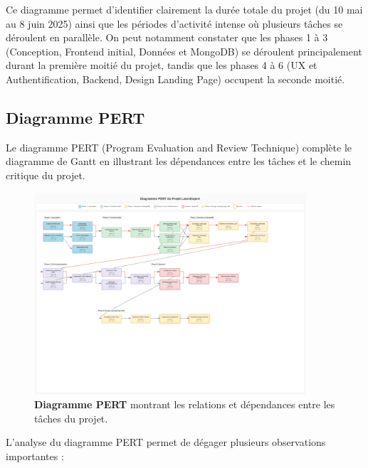 Ce diagramme permet d'identifier clairement la durée totale du projet (du 10 mai au 8 juin 2025) ainsi que les périodes d'activité intense où plusieurs tâches se déroulent en parallèle. On peut notamment constater que les phases 1 à 3 (Conception, Frontend initial, Données et MongoDB) se déroulent principalement durant la première moitié du projet, tandis que les phases 4 à 6 (UX et Authentification, Backend, Design Landing Page) occupent la seconde moitié.

\subsection{Diagramme PERT}
Le diagramme PERT (Program Evaluation and Review Technique) complète le diagramme de Gantt en illustrant les dépendances entre les tâches et le chemin critique du projet.

\begin{figure}[htb]
  \centering
  \includegraphics[width=0.9\textwidth,keepaspectratio]{images/gestion_projet/pert_diagram.png}
  \caption{\textbf{Diagramme PERT} montrant les relations et dépendances entre les tâches du projet.}
  \label{fig:pert_diagram}
\end{figure}

L'analyse du diagramme PERT permet de dégager plusieurs observations importantes :

